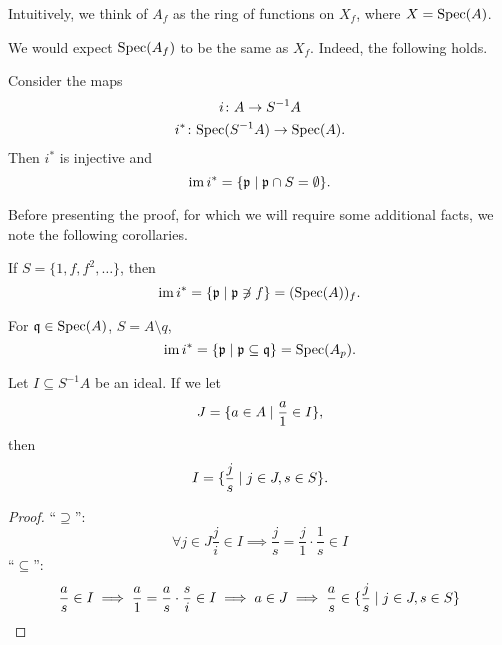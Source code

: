 Intuitively, we think of $A_f$ as the ring of functions on $X_f$, where $X = \text{Spec}(A)$.

We would expect $\text{Spec}(A_f)$ to be the same as $X_f$. Indeed, the following holds.

\begin{prop}
  \label{loc-2}
  Consider the maps
  \begin{gather*}
    i \colon A \to S^{-1}A \\
    i^* \colon \text{Spec}(S^{-1}A) \to \text{Spec}(A).
  \end{gather*}
  Then $i^*$ is injective and
  \[ \operatorname*{im} i^* = \{ \mathfrak p \mathrel{|} \mathfrak p \cap S = \emptyset \}. \]
\end{prop}

Before presenting the proof, for which we will require some additional facts, we note the following corollaries.

\begin{corollary}
  If $S = \{1, f, f^2, \ldots \}$, then
  \[ \operatorname*{im} i^* = \{ \mathfrak p \mathrel{|} \mathfrak p \not\ni f\} = (\text{Spec}(A))_f. \]
\end{corollary}

\begin{corollary}
  For $\mathfrak q \in \text{Spec}(A)$, $S = A \setminus q$,
  \[ \operatorname*{im} i^* = \{ \mathfrak p \mathrel{|} \mathfrak p \subseteq \mathfrak q \} = \text{Spec}(A_p). \]
\end{corollary}

\begin{lemma}
  \label{loc-3}
  Let $I \subseteq S^{-1}A$ be an ideal. If we let
  \[ J = \{ a \in A \mathrel{|} \frac{a}{1} \in I \}, \]
  then
  \[ I = \{ \frac{j}{s} \mathrel{|} j \in J, s \in S\}. \]
\end{lemma}
\begin{proof}
  ``$\supseteq$'':
  \[ \forall j \in J \frac{j}{i} \in I \implies \frac{j}{s} = \frac{j}{1} \cdot \frac{1}{s} \in I \]
  ``$\subseteq$'':
  \[ \frac{a}{s} \in I \implies \frac{a}{1} = \frac{a}{s} \cdot \frac{s}{i} \in I \implies a \in J \implies \frac{a}{s} \in \{\frac{j}{s} \mathrel{|} j \in J, s \in S \}\]
\end{proof}

